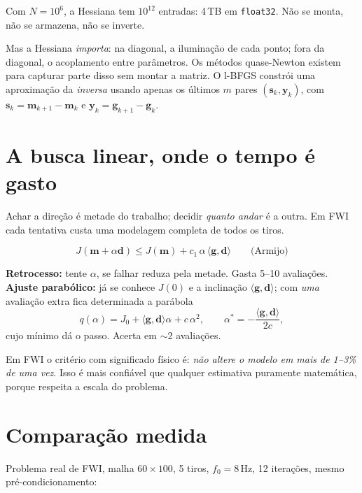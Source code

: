 \documentclass[11pt,a4paper,oneside]{report}
\begin{document}
Com $N = 10^{6}$, a Hessiana tem $10^{12}$ entradas: 4\,TB em
\texttt{float32}. Não se monta, não se armazena, não se inverte.

Mas a Hessiana \emph{importa}: na diagonal, a iluminação de cada ponto; fora
da diagonal, o acoplamento entre parâmetros. Os métodos quase-Newton existem
para capturar parte disso sem montar a matriz. O l-BFGS constrói uma
aproximação da \emph{inversa} usando apenas os últimos $m$ pares
$(\mathbf{s}_k, \mathbf{y}_k)$, com $\mathbf{s}_k = \mathbf{m}_{k+1}-\mathbf{m}_k$
e $\mathbf{y}_k = \mathbf{g}_{k+1}-\mathbf{g}_k$.

\section{A busca linear, onde o tempo é gasto}

Achar a direção é metade do trabalho; decidir \emph{quanto andar} é a outra.
Em FWI cada tentativa custa uma modelagem completa de todos os tiros.

\begin{equation}
J(\mathbf{m} + \alpha\mathbf{d}) \le J(\mathbf{m})
 + c_1\,\alpha\,\langle\mathbf{g},\mathbf{d}\rangle
\qquad\text{(Armijo)}
\end{equation}

\textbf{Retrocesso:} tente $\alpha$, se falhar reduza pela metade. Gasta 5--10
avaliações. \textbf{Ajuste parabólico:} já se conhece $J(0)$ e a inclinação
$\langle\mathbf{g},\mathbf{d}\rangle$; com \emph{uma} avaliação extra fica
determinada a parábola
\[
q(\alpha) = J_0 + \langle\mathbf{g},\mathbf{d}\rangle\alpha + c\,\alpha^{2},
\qquad
\alpha^{*} = -\frac{\langle\mathbf{g},\mathbf{d}\rangle}{2c},
\]
cujo mínimo dá o passo. Acerta em $\sim$2 avaliações.

\begin{pratica}
Em FWI o critério com significado físico é: \emph{não altere o modelo em mais
de 1--3\% de uma vez}. Isso é mais confiável que qualquer estimativa
puramente matemática, porque respeita a escala do problema.
\end{pratica}

\section{Comparação medida}

Problema real de FWI, malha $60\times100$, 5 tiros, $f_0 = 8$\,Hz, 12
iterações, mesmo pré-condicionamento:
\end{document}
